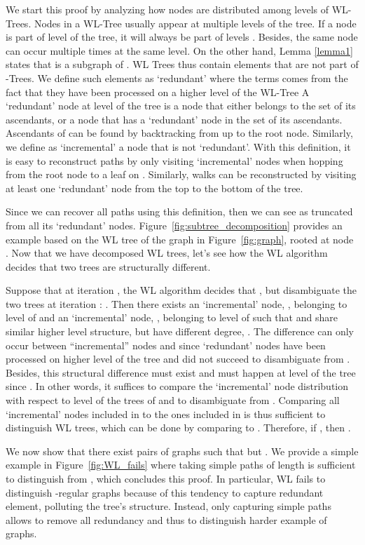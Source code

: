 \documentclass{article}
\theoremstyle{plain}
\theoremstyle{definition}
\theoremstyle{remark}
\begin{document}
We start this proof by analyzing how nodes are distributed among levels of WL-Trees.
Nodes in a WL-Tree usually appear at multiple levels of the tree. 
If a node is part of level  of the tree, it will always be part of levels .
Besides, the same node can occur multiple times at the same level. 
On the other hand, Lemma \ref{lemma1} states that  is a subgraph of . 
WL Trees thus contain elements that are not part of -Trees. 
We define such elements as `redundant' where the terms comes from the fact that they have been processed on a higher level of the WL-Tree 
A `redundant' node  at level  of the tree is a node that either belongs to the set of its ascendants, or a node that has a `redundant' node in the set of its ascendants.
Ascendants of  can be found by backtracking from  up to the root node. 
Similarly, we define as `incremental' a node that is not `redundant'. 
With this definition, it is easy to reconstruct paths by only visiting `incremental' nodes when hopping from the root node to a leaf on .
Similarly, walks can be reconstructed by visiting at least one `redundant' node from the top to the bottom of the tree. 

Since we can recover all paths using this definition, then we can see  as  truncated from all its `redundant' nodes. Figure~\ref{fig:subtree_decomposition} provides an example based on the WL tree of the graph in Figure~\ref{fig:graph}, rooted at node . 
Now that we have decomposed WL trees, let's see how the WL algorithm decides that two trees are structurally different. 

Suppose that at iteration , the WL algorithm decides that , but disambiguate the two trees at iteration : . 
Then there exists an `incremental' node, , belonging to level  of  and an `incremental' node, , belonging to level  of  such that  and  share similar higher level structure, but have different degree, . 
The difference can only occur between ``incremental'' nodes  and  since `redundant' nodes have been processed on higher level of the tree  and did not succeed to disambiguate  from  .
Besides, this structural difference must exist and must happen at level  of the tree since .  
In other words, it suffices to compare the `incremental' node distribution with respect to level  of the trees of  and   to disambiguate  from . 
Comparing all `incremental' nodes included in  to the ones included in  is thus sufficient to distinguish WL trees, which can be done by comparing  to . 
Therefore, if , then . 

We now show that there exist pairs of graphs such that  but . We provide a simple example in Figure~\ref{fig:WL_fails} where taking simple paths of length  is sufficient to distinguish  from , which concludes this proof. In particular, WL fails to distinguish -regular graphs because of this tendency to capture redundant element, polluting the tree's structure. Instead, only capturing simple paths allows to remove all redundancy and thus to distinguish harder example of graphs. 
\end{document}
